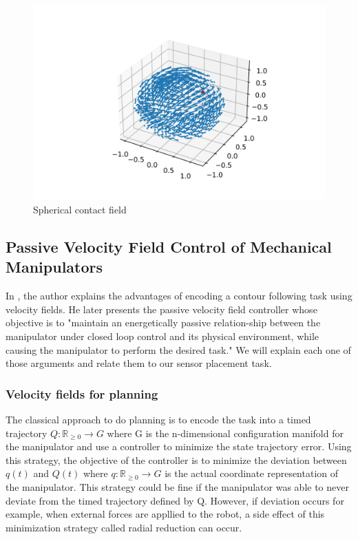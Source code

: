 \begin{figure}[h!]
    \centering
    \includegraphics[width=\linewidth]{Images/sphericalfield.png}
    \caption{Spherical contact field}
    \label{fig:spherical}
\end{figure}


\subsection{Passive Velocity Field Control of Mechanical Manipulators}
In \cite{li1999passive}, the author explains the advantages of encoding a contour following task using velocity fields. 
He later presents the passive velocity field controller whose objective is to "maintain an energetically passive relation-ship between the manipulator under closed loop control and
its physical environment, while causing the manipulator to perform the desired task." 
We will explain each one of those arguments and relate them to our sensor placement task.
\subsubsection{Velocity fields for planning}
The classical approach to do planning is to encode the task into a timed trajectory $Q:\mathbb R_{\ge 0} \rightarrow G$ where G is the n-dimensional configuration manifold for the manipulator and use a controller to minimize the state trajectory error.
Using this strategy, the objective of the controller is to minimize the deviation between $q(t)$ and $Q(t)$ where $q:\mathbb R_{\ge 0} \rightarrow G$ is the actual coordinate representation of the manipulator.
This strategy could be fine if the manipulator was able to never deviate from the timed trajectory defined by Q. However, if deviation occurs for example, when external forces are appllied to the
robot, a side effect of this minimization strategy called radial reduction can occur.

